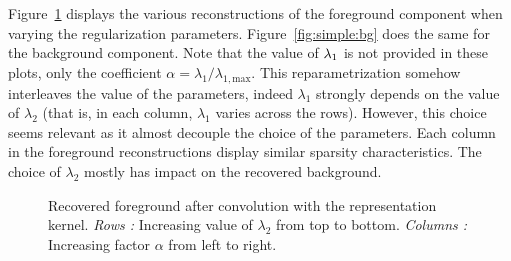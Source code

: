     Figure~\ref{fig:simple:fg-merged} displays the various reconstructions of the foreground component when varying the regularization parameters. Figure~\ref{fig:simple:bg} does the same for the background component. Note that the value of $\lambda_{1}$ is not provided in these plots, only the coefficient $\alpha = \lambda_1 / \lambda_{1, \mathrm{max}}$. This reparametrization somehow interleaves the value of the parameters, indeed $\lambda_1$ strongly depends on the value of $\lambda_2$ (that is, in each column, $\lambda_1$ varies across the rows). However, this choice seems relevant as it almost decouple the choice of the parameters. Each column in the foreground reconstructions display similar sparsity characteristics. The choice of $\lambda_2$ mostly has impact on the recovered background.

    \vfill

    \begin{figure}[h]
        \caption{Recovered foreground after convolution with the representation kernel. \textit{Rows :} Increasing value of $\lambda_2$ from top to bottom. \textit{Columns :} Increasing factor $\alpha$ from left to right.}
        \label{fig:simple:fg-merged}        
    \end{figure}

